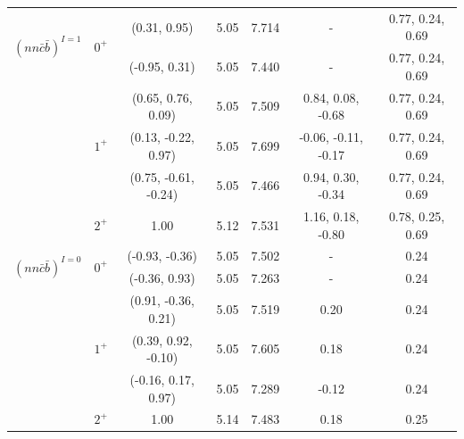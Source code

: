 \documentclass[prd,twocolumn,floatfix,nofootinbib]{revtex4}
\begin{document}
\begin{table}[!htbp]
\begin{tabular}{ccccccc}
        \multirow{2}{*}{${(nn\bar{c}\bar{b})}^{I=1}$}
                        &\multirow{2}{*}{$0^{+}$}
                                    &(0.31, 0.95)           &5.05	    &7.714	    &-                      &0.77, 0.24, 0.69 \\ 
                        &           &(-0.95, 0.31)          &5.05	    &7.440	    &-                      &0.77, 0.24, 0.69 \\ 
                        &\multirow{3}{*}{$1^{+}$}
                                    &(0.65, 0.76, 0.09)     &5.05	    &7.509	    &0.84, 0.08, -0.68      &0.77, 0.24, 0.69 \\ 
                        &           &(0.13, -0.22, 0.97)    &5.05	    &7.699	    &-0.06, -0.11, -0.17    &0.77, 0.24, 0.69 \\ 
                        &           &(0.75, -0.61, -0.24)   &5.05	    &7.466	    &0.94, 0.30, -0.34      &0.77, 0.24, 0.69 \\ 
                        &$2^{+}$    &1.00                   &5.12	    &7.531	    &1.16, 0.18, -0.80      &0.78, 0.25, 0.69 \\ 
        \multirow{2}{*}{${(nn\bar{c}\bar{b})}^{I=0}$}
                        &\multirow{2}{*}{$0^{+}$}
                                    &(-0.93, -0.36)         &5.05	    &7.502	    &-                      &0.24 \\ 
                        &           &(-0.36, 0.93)          &5.05	    &7.263	    &-                      &0.24 \\ 
                        &\multirow{3}{*}{$1^{+}$}
                                    &(0.91, -0.36, 0.21)    &5.05	    &7.519	    &0.20                   &0.24 \\ 
                        &           &(0.39, 0.92, -0.10)    &5.05	    &7.605	    &0.18                   &0.24 \\ 
                        &           &(-0.16, 0.17, 0.97)    &5.05	    &7.289	    &-0.12                  &0.24 \\ 
                        &$2^{+}$    &1.00                   &5.14	    &7.483	    &0.18                   &0.25 \\ 
        \hline\hline
    \end{tabular}
\end{table}
\end{document}
